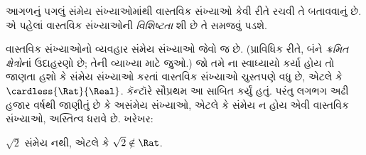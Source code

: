\documentclass[../../../include/open-logic-section]{subfiles}
\begin{document}

આગળનું પગલું સંમેય સંખ્યાઓમાંથી વાસ્તવિક સંખ્યાઓ કેવી રીતે રચવી તે
બતાવવાનું છે. એ પહેલાં વાસ્તવિક સંખ્યાઓની \emph{વિશિષ્ટતા} શી છે તે
સમજવું પડશે.

વાસ્તવિક સંખ્યાઓનો વ્યવહાર સંમેય સંખ્યાઓ જેવો જ છે. (પ્રાવિધિક રીતે,
બંને \emph{ક્રમિત ક્ષેત્રો}નાં ઉદાહરણો છે; તેની વ્યાખ્યા માટે
 જુઓ.) જો તમે ના
સ્વાધ્યાયો કર્યા હોય તો જાણતા હશો કે સંમેય સંખ્યાઓ કરતાં વાસ્તવિક
સંખ્યાઓ ચુસ્તપણે વધુ છે, એટલે કે $\cardless{\Rat}{\Real}$. કૅન્ટૉરે
સૌપ્રથમ આ સાબિત કર્યું હતું. પરંતુ લગભગ અઢી હજાર વર્ષથી જાણીતું છે કે
અસંમેય સંખ્યાઓ, એટલે કે સંમેય ન હોય એવી વાસ્તવિક સંખ્યાઓ, અસ્તિત્વ
ધરાવે છે. ખરેખર:
\begin{thm}
$\sqrt{2}$ સંમેય નથી, એટલે કે $\sqrt{2} \notin \Rat$.
\end{thm}
\end{document}
